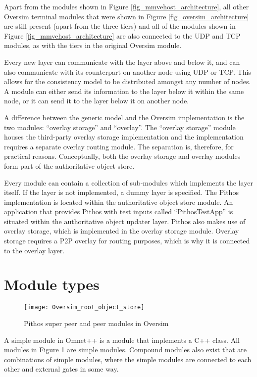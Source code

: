 Apart from the modules shown in Figure \ref{fig_mmvehost_architecture}, all other Oversim terminal modules that were shown in Figure \ref{fig_oversim_architecture} are still present (apart from the three tiers) and all of the modules shown in Figure \ref{fig_mmvehost_architecture} are also connected to the UDP and TCP modules, as with the tiers in the original Oversim module.

Every new layer can communicate with the layer above and below it, and can also communicate with its counterpart on another node using UDP or TCP. This allows for the consistency model to be distributed amongst any number of nodes. A module can either send its information to the layer below it within the same node, or it can send it to the layer below it on another node.

A difference between the generic model and the Oversim implementation is the two modules: ``overlay storage'' and ``overlay''. The ``overlay storage'' module houses the third-party overlay storage implementation and the implementation requires a separate overlay routing module. The separation is, therefore, for practical reasons. Conceptually, both the overlay storage and overlay modules form part of the authoritative object store.

Every module can contain a collection of sub-modules which implements the layer itself. If the layer is not implemented, a dummy layer is specified. The Pithos implementation is located within the authoritative object store module. An application that provides Pithos with test inputs called ``PithosTestApp'' is situated within the authoritative object updater layer. Pithos also makes use of overlay storage, which is implemented in the overlay storage module. Overlay storage requires a P2P overlay for routing purposes, which is why it is connected to the overlay layer.

\section{Module types}
\label{pithos_module_types}

\begin{figure}[htbp]
 \centering
 \texttt{[image: Oversim\_root\_object\_store]}
 \caption{Pithos super peer and peer modules in Oversim}
 \label{fig_oversim_root_object_store}
\end{figure}
%
A simple module in Omnet++ is a module that implements a C++ class. All modules in Figure \ref{fig_oversim_root_object_store} are simple modules. Compound modules also exist that are combinations of simple modules, where the simple modules are connected to each other and external gates in some way.

